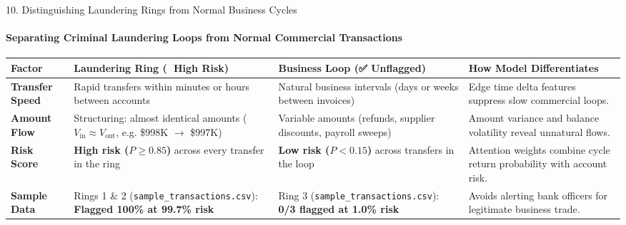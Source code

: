 \documentclass[aspectratio=169, 11pt]{beamer}
\begin{document}
\begin{frame}{10. Distinguishing Laundering Rings from Normal Business Cycles}
    \framesubtitle{Separating Criminal Laundering Loops from Normal Commercial Transactions}
    \vspace{-0.35cm}
    \centering
    \renewcommand{\arraystretch}{0.98}
    \scriptsize
    \begin{tabularx}{\textwidth}{p{2.1cm} p{3.3cm} p{3.3cm} X}
        \toprule
        \textbf{Factor} & \textbf{Laundering Ring (🚨 High Risk)} & \textbf{Business Loop (✅ Unflagged)} & \textbf{How Model Differentiates} \\
        \midrule
        \textbf{Transfer Speed} & Rapid transfers within minutes or hours between accounts & Natural business intervals (days or weeks between invoices) & Edge time delta features suppress slow commercial loops. \\
        \addlinespace[2pt]
        \textbf{Amount Flow} & Structuring: almost identical amounts ($V_{\text{in}} \approx V_{\text{out}}$, e.g. \$998K $\to$ \$997K) & Variable amounts (refunds, supplier discounts, payroll sweeps) & Amount variance and balance volatility reveal unnatural flows. \\
        \addlinespace[2pt]
        \textbf{Risk Score} & \textbf{High risk ($P \ge 0.85$)} across every transfer in the ring & \textbf{Low risk ($P < 0.15$)} across transfers in the loop & Attention weights combine cycle return probability with account risk. \\
        \addlinespace[2pt]
        \textbf{Sample Data} & Rings 1 \& 2 (\texttt{sample\_transactions.csv}): \textbf{Flagged 100\% at 99.7\% risk} & Ring 3 (\texttt{sample\_transactions.csv}): \textbf{0/3 flagged at 1.0\% risk} & Avoids alerting bank officers for legitimate business trade. \\
        \bottomrule
    \end{tabularx}
\end{frame}
\end{document}
